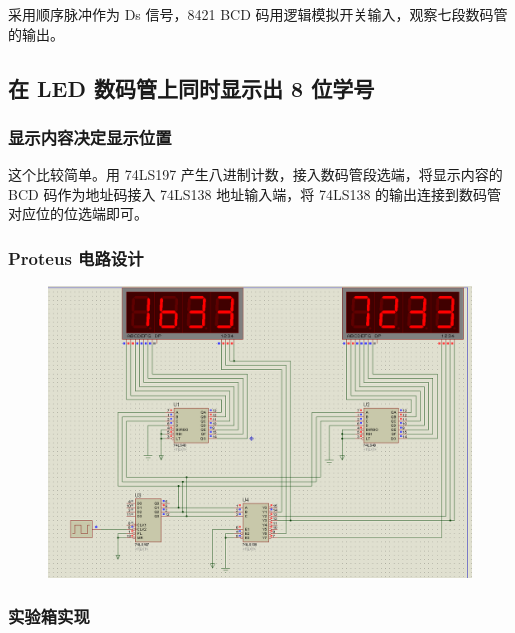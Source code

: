 \documentclass{article}
\begin{document}
采用顺序脉冲作为 Ds 信号，8421 BCD 码用逻辑模拟开关输入，观察七段数码管的输出。

\newpage

\subsection{在 LED 数码管上同时显示出 8 位学号}

\subsubsection{显示内容决定显示位置}

这个比较简单。用 74LS197 产生八进制计数，接入数码管段选端，将显示内容的 BCD 码作为地址码接入 74LS138 地址输入端，将 74LS138 的输出连接到数码管对应位的位选端即可。

\subsubsection*{Proteus 电路设计}

\begin{figure}[!hbp]
  \centering
  \includegraphics[scale=0.3]{lab7-1.png}
\end{figure}

\newpage

\subsubsection*{实验箱实现}
\end{document}
